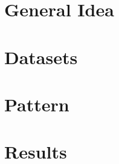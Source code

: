 \label{chapter:evaluation}

\section{General Idea}

\section{Datasets}

\section{Pattern}

\section{Results}